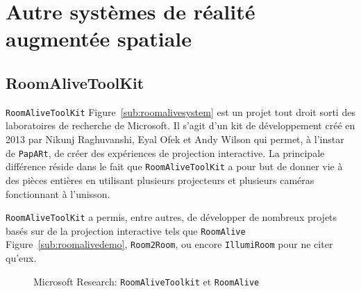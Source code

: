 \section{Autre systèmes de réalité augmentée spatiale}
\label{sec:SARother}

\subsection{RoomAliveToolKit} 
\texttt{RoomAliveToolKit}\cite{Jones:2014:RME:2642918.2647383} Figure~\ref{sub:roomalivesystem} est un projet tout droit sorti des laboratoires de recherche de Microsoft. Il s'agit d'un kit de développement créé en 2013 par Nikunj Raghuvanshi, Eyal Ofek et Andy Wilson qui permet, à l'instar de \texttt{\texttt{PapARt}}, de créer des expériences de projection interactive. La principale différence réside dans le fait que \texttt{RoomAliveToolKit} a pour but de donner vie à des pièces entières en utilisant plusieurs projecteurs et plusieurs caméras fonctionnant à l'unisson.

\texttt{RoomAliveToolKit} a permis, entre autres, de développer de nombreux projets basés sur de la projection interactive tels que \texttt{RoomAlive} Figure~\ref{sub:roomalivedemo}, \texttt{Room2Room}, ou encore \texttt{IllumiRoom} pour ne citer qu'eux.

\begin{figure}[H]
    \centering
\caption{Microsoft Research: \texttt{RoomAliveToolkit} et \texttt{RoomAlive}\protect\footnotemark}
\label{fig:roomalive}
\end{figure}

